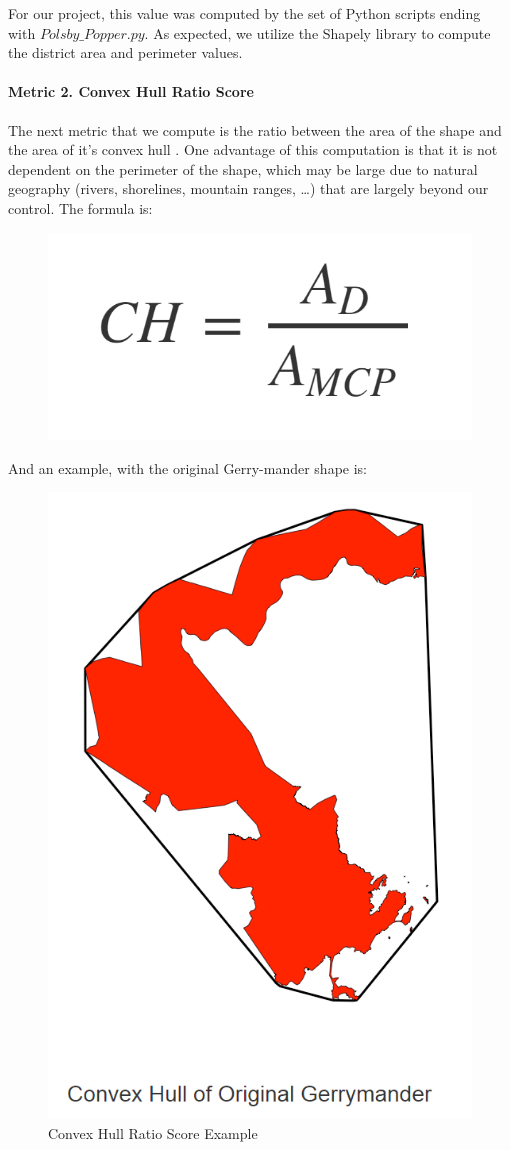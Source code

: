 \documentclass[11pt]{article}
\begin{document}
For our project, this value was computed by the set of Python scripts ending with $Polsby\_Popper.py$. As expected, we utilize the Shapely library to compute the district area and perimeter values.

\paragraph{Metric 2. Convex Hull Ratio Score}

The next metric that we compute is the ratio between the area of the shape and the area of it's convex hull \cite{OtherMetrics}. One advantage of this computation is that it is not dependent on the perimeter of the shape, which may be large due to natural geography (rivers, shorelines, mountain ranges, \dots) that are largely beyond our control. The formula is:

\begin{figure}[H]
	\centering
	\includegraphics[width=.2\textwidth]{cheq}
	\label{fig:cheq}
\end{figure}

And an example, with the original Gerry-mander shape is:

\begin{figure}[H]
	\centering
	\includegraphics[width=.55\textwidth]{chex}
	\caption{Convex Hull Ratio Score Example}
	\label{fig:chex}
\end{figure}
\end{document}
